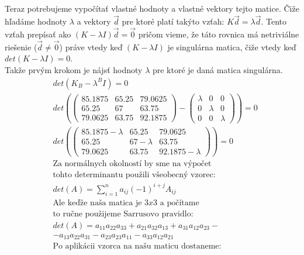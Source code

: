 \documentclass[a4paper]{article}
\begin{document}
	\subsection{}
	Teraz potrebujeme vypočítať vlastné hodnoty a vlastné vektory tejto matice. Čiže hľadáme hodnoty $\lambda$ a vektory $\vec{d}$ pre ktoré platí takýto vzťah:
	$K \vec{d}=\lambda \vec{d}$. Tento vzťah prepísať ako $(K-\lambda I) \vec{d} = \vec{0}$ pričom vieme, že táto rovnica má netriviálne riešenie ($\vec{d} \neq \vec{0}$) práve vtedy keď $(K-\lambda I)$ je singulárna matica, čiže vtedy keď $det(K-\lambda I)=0$.
	\\
	Takže prvým krokom je nájsť hodnoty $\lambda$ pre ktoré je daná matica singulárna.
	\begin{align*}
		&det(K_B-\lambda^B I)=0
		\\
		&det(
		\begin{pmatrix}
			85.1875 & 65.25 & 79.0625 \\
			65.25 & 67 & 63.75 \\
			79.0625 & 63.75 & 92.1875
		\end{pmatrix}
		-	
		\begin{pmatrix}
			\lambda & 0 & 0 \\
			0 & \lambda & 0 \\
			0 & 0 & \lambda
		\end{pmatrix})=0
		\\		
		&det(
		\begin{pmatrix}
			85.1875-\lambda & 65.25 & 79.0625 \\
			65.25 & 67-\lambda & 63.75 \\
			79.0625 & 63.75 & 92.1875-\lambda
		\end{pmatrix})=0
		\\
		&\text{Za normálnych okolností by sme na výpočet}
		\\
		&\text{tohto determinantu použili všeobecný vzorec:}
		\\
		&det(A)=\sum_{i=1}^{n}a_{ij}(-1)^{i+j}A_{ij}
		\\
		&\text{Ale keďže naša matica je $3x3$ a počítame}
		\\
		&\text{to ručne použijeme Sarrusovo pravidlo:}
		\\
		&det(A)=a_{11}a_{22}a_{33}+a_{21}a_{32}a_{13}+a_{31}a_{12}a_{23}-
		\\
		&-a_{13}a_{22}a_{31}-a_{23}a_{23}a_{11}-a_{33}a_{12}a_{21}
		\\
		&\text{Po aplikácii vzorca na našu maticu dostaneme:}
		\\

\end{align*}
\end{document}

